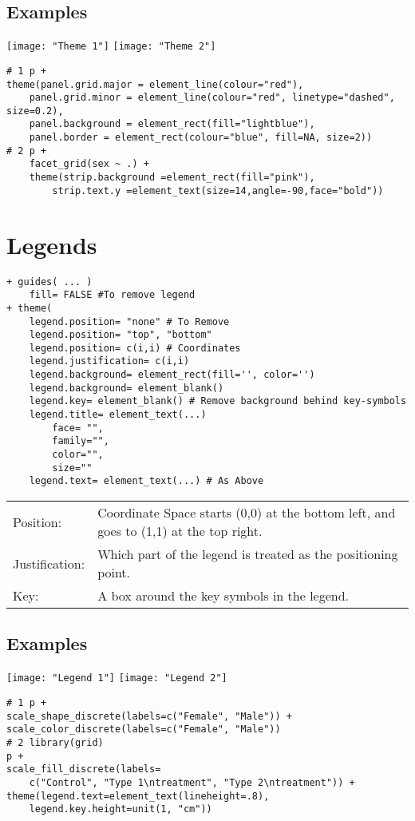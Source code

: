 \documentclass[]{article}
\begin{document}
\subsection{Examples}
\texttt{[image: "Theme 1"]}
\texttt{[image: "Theme 2"]} \\
\begin{verbatim}
# 1 p + 
theme(panel.grid.major = element_line(colour="red"), 
	panel.grid.minor = element_line(colour="red", linetype="dashed", size=0.2),
	panel.background = element_rect(fill="lightblue"), 
	panel.border = element_rect(colour="blue", fill=NA, size=2))
# 2 p + 
	facet_grid(sex ~ .) +
	theme(strip.background =element_rect(fill="pink"), 
		strip.text.y =element_text(size=14,angle=-90,face="bold"))
\end{verbatim}

\section{Legends}
\begin{verbatim}
+ guides( ... ) 
	fill= FALSE #To remove legend
+ theme(
	legend.position= "none" # To Remove
	legend.position= "top", "bottom"
	legend.position= c(i,i) # Coordinates
	legend.justification= c(i,i)
	legend.background= element_rect(fill='', color='')
	legend.background= element_blank()
	legend.key= element_blank()	# Remove background behind key-symbols
	legend.title= element_text(...)
		face= "",
		family="",
		color="",
		size=""
	legend.text= element_text(...) # As Above
\end{verbatim}
\begin{tabular}{l l}
	Position: & Coordinate Space starts (0,0) at the bottom left, 
				and goes to (1,1) at the top right. \\
	Justification:& Which part of the legend is treated as the positioning point.\\
	Key: & A box around the key symbols in the legend. \\
\end{tabular}

\subsection{Examples}
\texttt{[image: "Legend 1"]}
\texttt{[image: "Legend 2"]} \\
\begin{verbatim}
# 1 p + 
scale_shape_discrete(labels=c("Female", "Male")) + 
scale_color_discrete(labels=c("Female", "Male"))
# 2 library(grid)
p + 
scale_fill_discrete(labels=
	c("Control", "Type 1\ntreatment", "Type 2\ntreatment")) + 
theme(legend.text=element_text(lineheight=.8), 
	legend.key.height=unit(1, "cm")) 
\end{verbatim}
\end{document}

